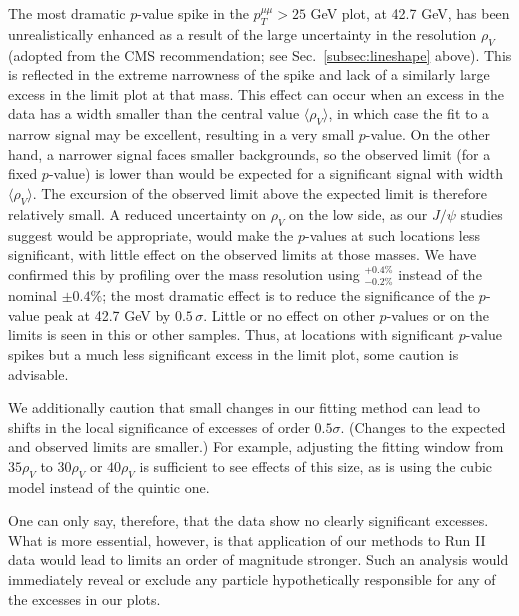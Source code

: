 \documentclass[aps,prd,twocolumn,superscriptaddress,preprintnumbers,nofootinbib,longbibliography,floatfix]{revtex4-1}
\newcommand{\ptmm}{p_T^{\mu\mu}}
\DeclareRobustCommand{\Sec}[1]{Sec.~\ref{#1}}
\begin{document}
The most dramatic $p$-value spike in the $\ptmm>25$ GeV plot, at 42.7 GeV, has been unrealistically enhanced as a result of the large uncertainty in the resolution $\rho_V$ (adopted from the CMS recommendation; see \Sec{subsec:lineshape} above).  
%
This is reflected in the extreme narrowness of the spike and lack of a similarly large excess in the limit plot at that mass. 
%
This effect can occur when an excess in the data has a width smaller than the central value $\langle\rho_V\rangle$, in which case the fit to a narrow signal may be excellent, resulting in a very small $p$-value.
%
On the other hand, a narrower signal faces smaller backgrounds, so the observed limit (for a fixed $p$-value) is lower than would be expected for a significant signal with width $\langle\rho_V\rangle$.
%
The excursion of the observed limit above the expected limit is therefore relatively small.
%
A reduced uncertainty on $\rho_V$ on the low side, as our $J/\psi$ studies suggest would be appropriate, would make the $p$-values at such locations less significant, with little effect on the observed limits at those masses.
%
We have confirmed this by profiling over the mass resolution using ${}^{+0.4\%}_{-0.2\%}$ instead of the nominal $\pm0.4\%$; the most dramatic effect  is to reduce the significance of the $p$-value peak at 42.7 GeV by $0.5\, \sigma$.
%
Little or no effect on other $p$-values or on the limits is seen in this or other samples.
%
Thus, at locations with significant $p$-value spikes but a much less significant excess in the limit plot, some caution is advisable.


We additionally caution that small changes in our fitting method can lead to shifts in the local significance of excesses of order $0.5\sigma$. 
%
(Changes to the expected and observed limits are smaller.)  
%
For example, adjusting the fitting window from $35\rho_V$ to $30\rho_V$ or $40\rho_V$ is sufficient to see effects of this size, as is using the cubic model instead of the quintic one.

One can only say, therefore, that the data show no clearly significant excesses.  
%
What is more essential, however, is that  application of our methods to Run II data would lead to limits an order of magnitude stronger.
%
Such an analysis would immediately reveal or exclude any particle hypothetically responsible for any of the excesses in our plots.
\end{document}
